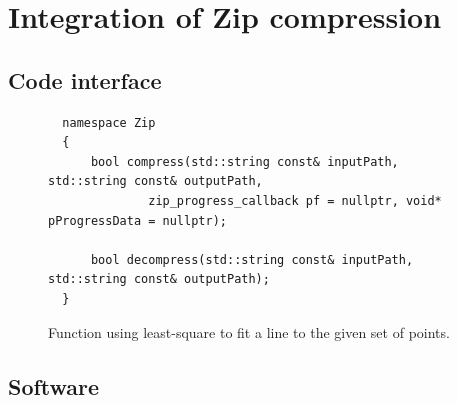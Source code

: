 \section{Integration of Zip compression}
\label{sc:integration}

\subsection{Code interface}
\begin{figure}
  \centering
  \begin{lstlisting}
  namespace Zip
  {
      bool compress(std::string const& inputPath, std::string const& outputPath,
              zip_progress_callback pf = nullptr, void* pProgressData = nullptr);

      bool decompress(std::string const& inputPath, std::string const& outputPath);
  }
  \end{lstlisting}
  \caption{Function using least-square to fit a line to the given set of points.}
  \label{fig:fitline}
\end{figure}


\subsection{\CC Software}
